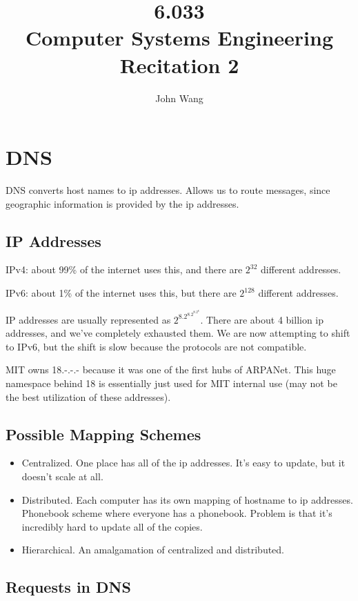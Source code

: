 \documentclass[psamsfonts]{amsart}
\title{6.033 \\
Computer Systems Engineering \\
Recitation 2}
\author{John Wang}
\begin{document}
\maketitle

\section{DNS}

DNS converts host names to ip addresses. Allows us to route messages, since geographic information is provided by the ip addresses. 

\subsection{IP Addresses}

IPv4: about 99\% of the internet uses this, and there are $2^{32}$ different addresses.

IPv6: about 1\% of the internet uses this, but there are $2^{128}$ different addresses.

IP addresses are usually represented as $2^8.2^8.2^8.2^8$. There are about 4 billion ip addresses, and we've completely exhausted them. We are now attempting to shift to IPv6, but the shift is slow because the protocols are not compatible.

MIT owns 18.-.-.- because it was one of the first hubs of ARPANet. This huge namespace behind 18 is essentially just used for MIT internal use (may not be the best utilization of these addresses). 

\subsection{Possible Mapping Schemes}

\begin{itemize}
  \item Centralized. One place has all of the ip addresses. It's easy to update, but it doesn't scale at all.
  \item Distributed. Each computer has its own mapping of hostname to ip addresses. Phonebook scheme where everyone has a phonebook. Problem is that it's incredibly hard to update all of the copies.
  \item Hierarchical. An amalgamation of centralized and distributed.
\end{itemize}

\subsection{Requests in DNS}
\end{document}
